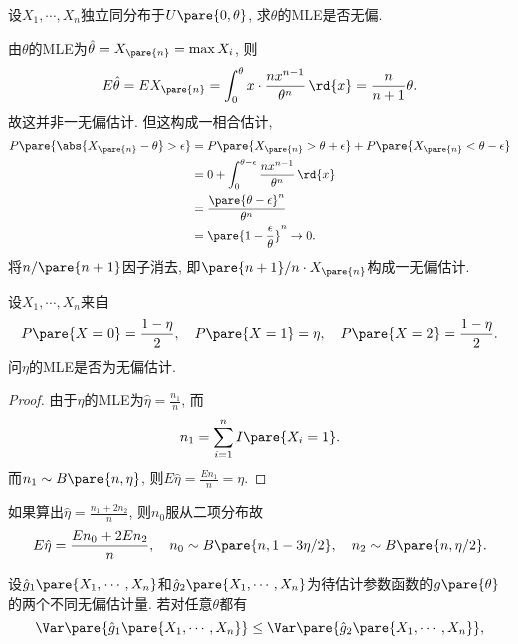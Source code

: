\documentclass[../Statistics.tex]{subfiles}
\begin{document}
\begin{sample}
    \begin{ex}
        设$X_1,\cdots,X_n$独立同分布于$U\pare{0,\theta}$, 求$\theta$的MLE是否无偏.
    \end{ex}
    \begin{solution}
        由$\theta$的MLE为$\hat\theta = X_{\pare{n}} = \max X_i$, 则
        \[ E\hat{\theta} = EX_{\pare{n}} = \int_0^\theta x\cdot \frac{nx^{n-1}}{\theta^n}\,\rd{x} = \frac{n}{n+1}\theta. \]
        故这并非一无偏估计. 但这构成一相合估计,
        \begin{align*}
            P\pare{\abs{X_{\pare{n}}-\theta}>\epsilon} &= P\pare{X_{\pare{n}} > \theta + \epsilon} + P\pare{X_{\pare{n}} < \theta-\epsilon} \\
            &= 0 + \int_0^{\theta-\epsilon} \frac{nx^{n-1}}{\theta^n} \,\rd{x} \\
            &= \frac{\pare{\theta-\epsilon}^n}{\theta^n} \\
            &= \pare{1-\frac{\epsilon}{\theta}}^n \rightarrow 0. \qedhere
        \end{align*}
        将$n/\pare{n+1}$因子消去, 即$\pare{n+1}/n\cdot X_{\pare{n}}$构成一无偏估计.
    \end{solution}
\end{sample}
\begin{sample}
    \begin{ex}
        设$X_1,\cdots,X_n$来自
        \[ P\pare{X=0} = \frac{1-\eta}{2},\quad P\pare{X=1} = \eta,\quad P\pare{X=2} = \frac{1-\eta}{2}. \]
        问$\eta$的MLE是否为无偏估计.
    \end{ex}
    \begin{proof}
        由于$\eta$的MLE为$\displaystyle \hat\eta = \frac{n_1}{n}$, 而
        \[ n_1 = \sum_{i=1}^n I\pare{X_i = 1}. \]
        而$n_1\sim B\pare{n,\eta}$, 则$\displaystyle E\hat{\eta} = \frac{En_1}{n} = \eta$.
    \end{proof}
    \begin{remark}
        如果算出$\displaystyle \hat\eta = \frac{n_1+2n_2}{n}$, 则$n_0$服从二项分布故
        \[ E\hat\eta = \frac{En_0 + 2En_2}{n},\quad n_0 \sim B\pare{n, 1-3\eta/2},\quad n_2 \sim B\pare{n,\eta/2}. \]
    \end{remark}
\end{sample}
设$\hat{g}_1\pare{X_1,\cdots,X_n}$和$\hat{g}_2\pare{X_1,\cdots,X_n}$为待估计参数函数的$g\pare{\theta}$的两个不同无偏估计量. 若对任意$\theta$都有
\[ \Var\pare{\hat{g}_1\pare{X_1,\cdots,X_n}} \le \Var\pare{\hat{g}_2\pare{X_1,\cdots,X_n}}, \]
\end{document}
